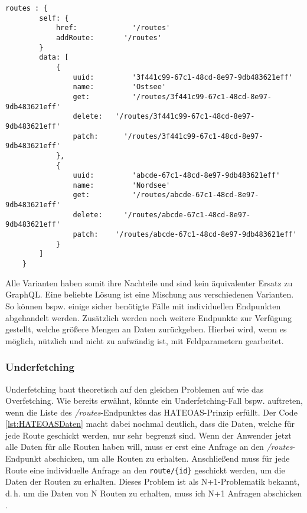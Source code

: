 \begin{lstlisting}[caption={Beispielliste der Routen mit HATEOAS},captionpos=b,label=lst:HATEOASDaten]
	routes : {
		self: {
			href:			  '/routes'
			addRoute:		'/routes'
		}
		data: [
			{
				uuid:		  '3f441c99-67c1-48cd-8e97-9db483621eff'
				name:		  'Ostsee'
				get:		  '/routes/3f441c99-67c1-48cd-8e97-9db483621eff'
				delete:	  '/routes/3f441c99-67c1-48cd-8e97-9db483621eff'
				patch:		'/routes/3f441c99-67c1-48cd-8e97-9db483621eff'
			},
			{
				uuid:		  'abcde-67c1-48cd-8e97-9db483621eff'
				name:		  'Nordsee'
				get: 		  '/routes/abcde-67c1-48cd-8e97-9db483621eff'
				delete: 	'/routes/abcde-67c1-48cd-8e97-9db483621eff'
				patch: 	  '/routes/abcde-67c1-48cd-8e97-9db483621eff'
			}
		]
	}
\end{lstlisting}


Alle Varianten haben somit ihre Nachteile und sind kein äquivalenter Ersatz zu GraphQL. Eine beliebte Lösung ist eine Mischung aus verschiedenen Varianten. So können bspw. einige sicher benötigte Fälle mit individuellen Endpunkten abgehandelt werden. Zusätzlich werden noch weitere Endpunkte zur Verfügung gestellt, welche größere Mengen an Daten zurückgeben. Hierbei wird, wenn es möglich, nützlich und nicht zu aufwändig ist, mit Feldparametern gearbeitet.

\subsubsection{Underfetching}\label{underfetching}

Underfetching baut theoretisch auf den gleichen Problemen auf wie das Overfetching. Wie bereits erwähnt, könnte ein Underfetching-Fall bspw. auftreten, wenn die Liste des \textit{/routes}-Endpunktes das \ac{HATEOAS}-Prinzip erfüllt. Der Code \ref{lst:HATEOASDaten} macht dabei nochmal deutlich, dass die Daten, welche für jede Route geschickt werden, nur sehr begrenzt sind. Wenn der Anwender jetzt alle Daten für alle Routen haben will, muss er erst eine Anfrage an den  \textit{/routes}-Endpunkt abschicken, um alle Routen zu erhalten. Anschließend muss für jede Route eine individuelle Anfrage an den \verb+route/{id}+ geschickt werden, um die Daten der Routen zu erhalten. Dieses Problem ist als N+1-Problematik bekannt, d.\,h. um die Daten von N Routen zu erhalten, muss ich N+1 Anfragen abschicken \parencite{Kheyrollahi2014}.

